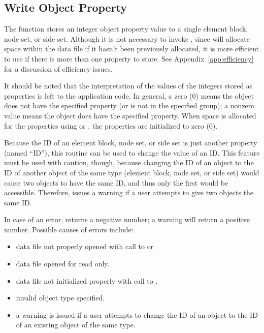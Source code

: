 \subsection{Write Object Property}

The function  stores an integer object property
value to a single element block, node set, or side set. Although it is
not necessary to invoke , since
 will allocate space within the data file if it
hasn't been previously allocated, it is more efficient to use
 if there is more than one property to
store. See Appendix~\ref{app:efficiency} for a discussion of
efficiency issues.


It should be noted that the interpretation of the values
of the integers stored as properties is left to the application
code. In general, a zero (0) means the object does not have the
specified property (or is not in the specified group); a nonzero
value means the object does have the specified property. When
space is allocated for the properties using 
or , the properties are initialized to
zero (0).


Because the ID of an element block, node set, or side set
is just another property (named ``ID''), this routine can be used
to change the value of an ID. This feature must be used with
caution, though, because changing the ID of an object to the
ID of another object of the same type (element block, node set,
or side set) would cause two objects to have the same ID, and
thus only the first would be accessible. Therefore, 
issues a warning if a user attempts to give two objects the
same ID.


In case of an error,  returns a negative
number; a warning will return a positive number.
Possible causes of errors include:

\begin{itemize}
 \item data file not properly opened with call to 
 or 

 \item data file opened for read only.

 \item data file not initialized properly with call to
 .

 \item invalid object type specified.

 \item a warning is issued if a user attempts to change the ID of an
 object to the ID of an existing object of the same type.
\end{itemize}


